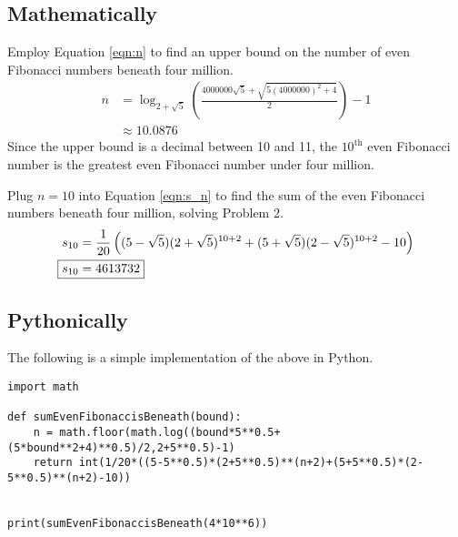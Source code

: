 \documentclass[titlepage]{article}
\begin{document}
\subsection{Mathematically}
Employ Equation \ref{eqn:n} to find an upper bound on the number of even Fibonacci numbers beneath four million.
\begin{align*}
    n &= \log_{2+\sqrt{5}}\left( \frac{4000000\sqrt{5}+\sqrt{5(4000000)^2+4}}{2} \right)-1\\
    &\approx 10.0876
\end{align*}
Since the upper bound is a decimal between 10 and 11, the $10^\text{th}$ even Fibonacci number is the greatest even Fibonacci number under four million.\par
Plug $n=10$ into Equation \ref{eqn:s_n} to find the sum of the even Fibonacci numbers beneath four million, solving Problem 2.
\begin{align*}
    s_{10} &= \frac{1}{20}\left( (5-\sqrt{5})(2+\sqrt{5})^{10+2}+(5+\sqrt{5})(2-\sqrt{5})^{10+2}-10 \right)\\
    \Aboxed{s_{10} &= 4613732}
\end{align*}


\subsection{Pythonically}
The following is a simple implementation of the above in Python.
\begin{lstlisting}
import math

def sumEvenFibonaccisBeneath(bound):
    n = math.floor(math.log((bound*5**0.5+(5*bound**2+4)**0.5)/2,2+5**0.5)-1)
    return int(1/20*((5-5**0.5)*(2+5**0.5)**(n+2)+(5+5**0.5)*(2-5**0.5)**(n+2)-10))


print(sumEvenFibonaccisBeneath(4*10**6))
\end{lstlisting}
\end{document}

